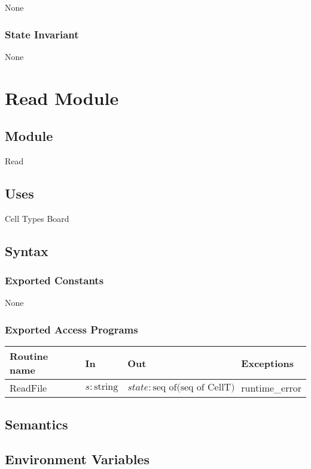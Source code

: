\documentclass[12pt]{article}
\begin{document}
None

\subsubsection* {State Invariant}

None

\newpage


\section* {Read Module}

\subsection*{Module}
Read

\subsection* {Uses}
Cell Types
Board

\subsection* {Syntax}

\subsubsection* {Exported Constants}

None

\subsubsection* {Exported Access Programs}

\begin{tabular}{| l | l | l | l |}
	\hline
	\textbf{Routine name} & \textbf{In} & \textbf{Out} & \textbf{Exceptions}\\
	\hline
	ReadFile & $s: \mbox{string}$ & $state: \mbox{seq of(seq of CellT)}$  & runtime\_error\\
	\hline
\end{tabular}


\subsection* {Semantics}

\subsection*{Environment Variables}
\end{document}
